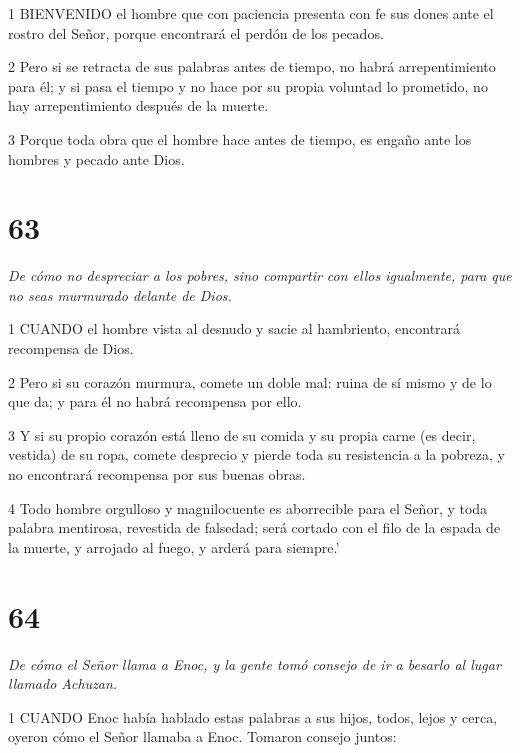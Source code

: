 \par 1 BIENVENIDO el hombre que con paciencia presenta con fe sus dones ante el rostro del Señor, porque encontrará el perdón de los pecados.

\par 2 Pero si se retracta de sus palabras antes de tiempo, no habrá arrepentimiento para él; y si pasa el tiempo y no hace por su propia voluntad lo prometido, no hay arrepentimiento después de la muerte.

\par 3 Porque toda obra que el hombre hace antes de tiempo, es engaño ante los hombres y pecado ante Dios.



\chapter{63}

\par \textit{De cómo no despreciar a los pobres, sino compartir con ellos igualmente, para que no seas murmurado delante de Dios.}

\par 1 CUANDO el hombre vista al desnudo y sacie al hambriento, encontrará recompensa de Dios.

\par 2 Pero si su corazón murmura, comete un doble mal: ruina de sí mismo y de lo que da; y para él no habrá recompensa por ello.

\par 3 Y si su propio corazón está lleno de su comida y su propia carne (es decir, vestida) de su ropa, comete desprecio y pierde toda su resistencia a la pobreza, y no encontrará recompensa por sus buenas obras.

\par 4 Todo hombre orgulloso y magnilocuente es aborrecible para el Señor, y toda palabra mentirosa, revestida de falsedad; será cortado con el filo de la espada de la muerte, y arrojado al fuego, y arderá para siempre.'

\chapter{64}

\par \textit{De cómo el Señor llama a Enoc, y la gente tomó consejo de ir a besarlo al lugar llamado Achuzan.}

\par 1 CUANDO Enoc había hablado estas palabras a sus hijos, todos, lejos y cerca, oyeron cómo el Señor llamaba a Enoc. Tomaron consejo juntos:

